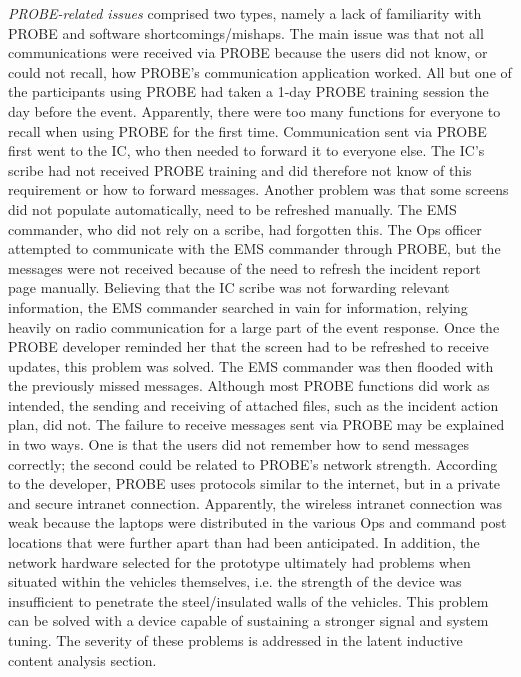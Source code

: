 \documentclass[link]{IWCOMP}
\begin{document}
\textit{PROBE-related issues} comprised two types, namely a lack of familiarity with PROBE and software
shortcomings/mishaps. The main issue was that not all communications were
received via PROBE because the users did not know, or could not recall, how
PROBE's communication application worked. All but one of the participants
using PROBE had taken a 1-day PROBE training session the day before the
event. Apparently, there were too many functions for everyone to recall when
using PROBE for the first time. Communication sent via PROBE first went to
the IC, who then needed to forward it to everyone else. The IC's scribe had
not received PROBE training and did therefore not know of this requirement
or how to forward messages. Another problem was that some screens did not
populate automatically, need to be refreshed manually. The EMS commander,
who did not rely on a scribe, had forgotten this. The Ops officer attempted
to communicate with the EMS commander through PROBE, but the messages were
not received because of the need to refresh the incident report page
manually. Believing that the IC scribe was not forwarding relevant
information, the EMS commander searched in vain for information, relying
heavily on radio communication for a large part of the event response. Once
the PROBE developer reminded her that the screen had to be refreshed to
receive updates, this problem was solved. The EMS commander was then flooded
with the previously missed messages. Although most PROBE functions did work
as intended, the sending and receiving of attached files, such as the
incident action plan, did not. The failure to receive messages sent via
PROBE may be explained in two ways. One is that the users did not remember
how to send messages correctly; the second could be related to PROBE's
network strength. According to the developer, PROBE uses protocols similar
to the internet, but in a private and secure intranet connection.
Apparently, the wireless intranet connection was weak because the laptops
were distributed in the various Ops and command post locations that were
further apart than had been anticipated. In addition, the network hardware
selected for the prototype ultimately had problems when situated within the
vehicles themselves, i.e. the strength of the device was insufficient to
penetrate the steel/insulated walls of the vehicles. This problem can be
solved with a device capable of sustaining a stronger signal and system
tuning. The severity of these problems is addressed in the latent inductive
content analysis section.
\end{document}
